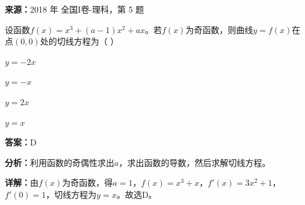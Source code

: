 \begin{question}[points=5]
\textbf{来源：}2018 年 全国I卷-理科，第 5 题\par
设函数$f(x)=x^3+(a-1)x^2+ax$。若$f(x)$为奇函数，则曲线$y=f(x)$在点$(0,0)$处的切线方程为（    ）
\begin{choices}
  \item $y=-2x$
  \item $y=-x$
  \item $y=2x$
  \item $y=x$
\end{choices}
\begin{solution}
\textbf{答案：}D

\textbf{分析：}利用函数的奇偶性求出$a$，求出函数的导数，然后求解切线方程。

\textbf{详解：}由$f(x)$为奇函数，得$a=1$，$f(x)=x^3+x$，$f'(x)=3x^2+1$，$f'(0)=1$，切线方程为$y=x$。故选D。
\end{solution}
\end{question}

